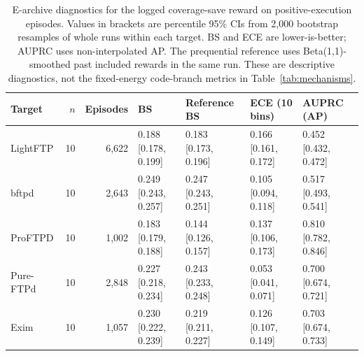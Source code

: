 \begin{table}[t]
\centering\footnotesize
\caption{E-archive diagnostics for the logged coverage-save reward on positive-execution episodes. Values in brackets are percentile 95\% CIs from 2,000 bootstrap resamples of whole runs within each target. BS and ECE are lower-is-better; AUPRC uses non-interpolated AP. The prequential reference uses Beta(1,1)-smoothed past included rewards in the same run. These are descriptive diagnostics, not the fixed-energy code-branch metrics in Table~\ref{tab:mechanisms}.}
\label{tab:logged_calibration}
\begin{tabularx}{\textwidth}{l r r *{4}{>{\centering\arraybackslash}X}}
\toprule
Target & $n$ & Episodes & BS & Reference BS & ECE (10 bins) & AUPRC (AP) \\
\midrule
LightFTP & 10 & 6,622 & \shortstack{0.188\\{[0.178, 0.199]}} & \shortstack{0.183\\{[0.173, 0.196]}} & \shortstack{0.166\\{[0.161, 0.172]}} & \shortstack{0.452\\{[0.432, 0.472]}} \\
bftpd & 10 & 2,643 & \shortstack{0.249\\{[0.243, 0.257]}} & \shortstack{0.247\\{[0.243, 0.251]}} & \shortstack{0.105\\{[0.094, 0.118]}} & \shortstack{0.517\\{[0.493, 0.541]}} \\
ProFTPD & 10 & 1,002 & \shortstack{0.183\\{[0.179, 0.188]}} & \shortstack{0.144\\{[0.126, 0.157]}} & \shortstack{0.137\\{[0.106, 0.173]}} & \shortstack{0.810\\{[0.782, 0.846]}} \\
Pure-FTPd & 10 & 2,848 & \shortstack{0.227\\{[0.218, 0.234]}} & \shortstack{0.243\\{[0.233, 0.248]}} & \shortstack{0.053\\{[0.041, 0.071]}} & \shortstack{0.700\\{[0.674, 0.721]}} \\
Exim & 10 & 1,057 & \shortstack{0.230\\{[0.222, 0.239]}} & \shortstack{0.219\\{[0.211, 0.227]}} & \shortstack{0.126\\{[0.107, 0.149]}} & \shortstack{0.703\\{[0.674, 0.733]}} \\

\end{tabularx}
\end{table}
